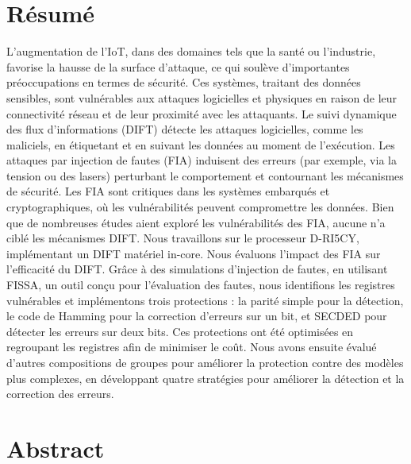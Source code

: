 \chapter*{Résumé}
\label{chapter:resume}

L'augmentation de l'IoT, dans des domaines tels que la santé ou l'industrie, favorise la hausse de la surface d'attaque, ce qui soulève d'importantes préoccupations en termes de sécurité. Ces systèmes, traitant des données sensibles, sont vulnérables aux attaques logicielles et physiques en raison de leur connectivité réseau et de leur proximité avec les attaquants.
Le suivi dynamique des flux d'informations (DIFT) détecte les attaques logicielles, comme les maliciels, en étiquetant et en suivant les données au moment de l'exécution. Les attaques par injection de fautes (FIA) induisent des erreurs (par exemple, via la tension ou des lasers) perturbant le comportement et contournant les mécanismes de sécurité. Les FIA sont critiques dans les systèmes embarqués et cryptographiques, où les vulnérabilités peuvent compromettre les données. Bien que de nombreuses études aient exploré les vulnérabilités des FIA, aucune n'a ciblé les mécanismes DIFT.
Nous travaillons sur le processeur D-RI5CY, implémentant un DIFT matériel in-core. Nous évaluons l'impact des FIA sur l'efficacité du DIFT. Grâce à des simulations d'injection de fautes, en utilisant FISSA, un outil conçu pour l'évaluation des fautes, nous identifions les registres vulnérables et implémentons trois protections : la parité simple pour la détection, le code de Hamming pour la correction d'erreurs sur un bit, et SECDED pour détecter les erreurs sur deux bits. Ces protections ont été optimisées en regroupant les registres afin de minimiser le coût. Nous avons ensuite évalué d'autres compositions de groupes pour améliorer la protection contre des modèles plus complexes, en développant quatre stratégies pour améliorer la détection et la correction des erreurs.

\chapter*{Abstract}
\label{chapter:abstract}

